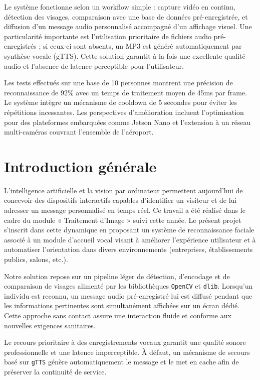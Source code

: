 \documentclass[12pt,a4paper]{article}
\begin{document}
Le système fonctionne selon un workflow simple : capture vidéo en continu, détection des visages, comparaison avec une base de données pré-enregistrée, et diffusion d'un message audio personnalisé accompagné d'un affichage visuel. Une particularité importante est l'utilisation prioritaire de fichiers audio pré-enregistrés ; si ceux-ci sont absents, un MP3 est généré automatiquement par synthèse vocale (gTTS). Cette solution garantit à la fois une excellente qualité audio et l'absence de latence perceptible pour l'utilisateur.

Les tests effectués sur une base de 10 personnes montrent une précision de reconnaissance de 92\% avec un temps de traitement moyen de 45ms par frame. Le système intègre un mécanisme de cooldown de 5 secondes pour éviter les répétitions incessantes. Les perspectives d'amélioration incluent l'optimisation pour des plateformes embarquées comme Jetson Nano et l'extension à un réseau multi-caméras couvrant l'ensemble de l'aéroport.

\newpage

\tableofcontents

\newpage

\section{Introduction générale}

L’intelligence artificielle et la vision par ordinateur permettent aujourd’hui de concevoir des dispositifs interactifs capables d’identifier un visiteur et de lui adresser un message personnalisé en temps réel. Ce travail a été réalisé dans le cadre du module « Traitement d’Image » suivi cette année. Le présent projet s’inscrit dans cette dynamique en proposant un système de reconnaissance faciale associé à un module d’accueil vocal visant à améliorer l’expérience utilisateur et à automatiser l’orientation dans divers environnements (entreprises, établissements publics, salons, etc.).

Notre solution repose sur un pipeline léger de détection, d’encodage et de comparaison de visages alimenté par les bibliothèques \texttt{OpenCV} et \texttt{dlib}. Lorsqu’un individu est reconnu, un message audio pré-enregistré lui est diffusé pendant que les informations pertinentes sont simultanément affichées sur un écran dédié. Cette approche sans contact assure une interaction fluide et conforme aux nouvelles exigences sanitaires.

Le recours prioritaire à des enregistrements vocaux garantit une qualité sonore professionnelle et une latence imperceptible. À défaut, un mécanisme de secours basé sur \texttt{gTTS} génère automatiquement le message et le met en cache afin de préserver la continuité de service.
\end{document}
